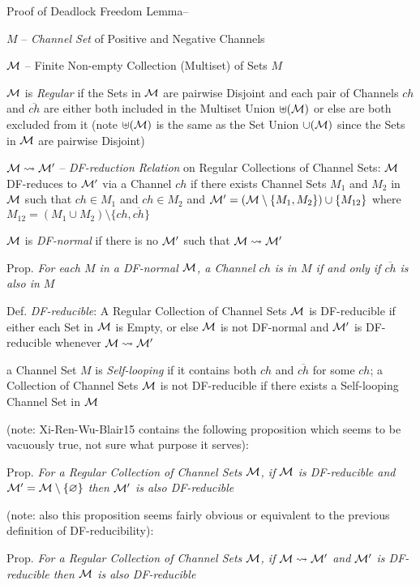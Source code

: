 Proof of Deadlock Freedom Lemma--

$M$ -- \emph{Channel Set} of Positive and Negative Channels

$\mathcal{M}$ -- Finite Non-empty Collection (Multiset) of Sets $M$

$\mathcal{M}$ is \emph{Regular} if the Sets in $\mathcal{M}$ are pairwise
Disjoint and each pair of Channels $ch$ and $\overline{ch}$ are either
both included in the Multiset Union $\uplus(\mathcal{M})$ or else are
both excluded from it (note $\uplus(\mathcal{M})$ is the same as the Set
Union $\cup(\mathcal{M})$ since the Sets in $\mathcal{M}$ are pairwise
Disjoint)

$\mathcal{M} \rightsquigarrow \mathcal{M}'$ -- \emph{DF-reduction
  Relation} on Regular Collections of Channel Sets: $\mathcal{M}$
DF-reduces to $\mathcal{M}'$ via a Channel $ch$ if there exists Channel
Sets $M_1$ and $M_2$ in $\mathcal{M}$ such that $ch \in M_1$ and $ch \in
M_2$ and $\mathcal{M}' = (\mathcal{M}\setminus\{M_1,M_2\}) \cup
\{M_{12}\}$ where $M_{12} = (M_1 \cup
M_2)\setminus\{ch,\overline{ch}\}$

$\mathcal{M}$ is \emph{DF-normal} if there is no $\mathcal{M}'$ such that
$\mathcal{M} \rightsquigarrow \mathcal{M}'$

Prop. \emph{For each $M$ in a DF-normal $\mathcal{M}$, a Channel $ch$ is
  in $M$ if and only if $\overline{ch}$ is also in $M$}

Def. \emph{DF-reducible}: A Regular Collection of Channel Sets
$\mathcal{M}$ is DF-reducible if either each Set in $\mathcal{M}$ is
Empty, or else $\mathcal{M}$ is not DF-normal and $\mathcal{M}'$ is
DF-reducible whenever $\mathcal{M} \rightsquigarrow \mathcal{M}'$

a Channel Set $M$ is \emph{Self-looping} if it contains both $ch$ and
$\overline{ch}$ for some $ch$; a Collection of Channel Sets
$\mathcal{M}$ is not DF-reducible if there exists a Self-looping Channel
Set in $\mathcal{M}$

(note: Xi-Ren-Wu-Blair15 contains the following proposition which
seems to be vacuously true, not sure what purpose it serves):

Prop. \emph{For a Regular Collection of Channel Sets $\mathcal{M}$, if
  $\mathcal{M}$ is DF-reducible and $\mathcal{M}' =
  \mathcal{M}\setminus\{\varnothing\}$ then $\mathcal{M}'$ is also
  DF-reducible}

(note: also this proposition seems fairly obvious or equivalent to the
previous definition of DF-reducibility):

Prop. \emph{For a Regular Collection of Channel Sets $\mathcal{M}$, if
  $\mathcal{M} \rightsquigarrow \mathcal{M}'$ and $\mathcal{M}'$ is
  DF-reducible then $\mathcal{M}$ is also DF-reducible}

